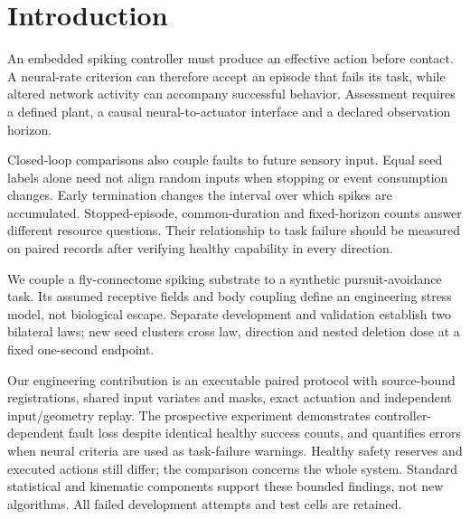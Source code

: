 \section{Introduction}
An embedded spiking controller must produce an effective action before contact. A neural-rate criterion can therefore accept an episode that fails its task, while altered network activity can accompany successful behavior. Assessment requires a defined plant, a causal neural-to-actuator interface and a declared observation horizon.

Closed-loop comparisons also couple faults to future sensory input. Equal seed labels alone need not align random inputs when stopping or event consumption changes. Early termination changes the interval over which spikes are accumulated. Stopped-episode, common-duration and fixed-horizon counts answer different resource questions. Their relationship to task failure should be measured on paired records after verifying healthy capability in every direction.

We couple a fly-connectome spiking substrate to a synthetic pursuit-avoidance task. Its assumed receptive fields and body coupling define an engineering stress model, not biological escape. Separate development and validation establish two bilateral laws; new seed clusters cross law, direction and nested deletion dose at a fixed one-second endpoint.

Our engineering contribution is an executable paired protocol with source-bound registrations, shared input variates and masks, exact actuation and independent input/geometry replay. The prospective experiment demonstrates controller-dependent fault loss despite identical healthy success counts, and quantifies errors when neural criteria are used as task-failure warnings. Healthy safety reserves and executed actions still differ; the comparison concerns the whole system. Standard statistical and kinematic components support these bounded findings, not new algorithms. All failed development attempts and test cells are retained.
